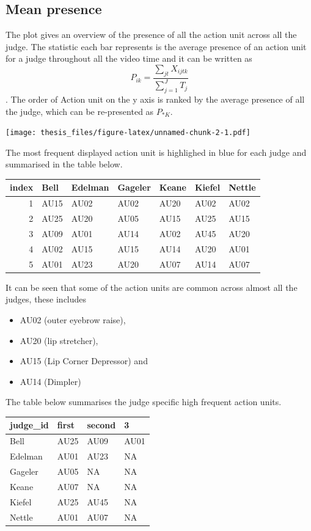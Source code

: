 \documentclass{monashthesis}
\begin{document}
\hypertarget{mean-presence}{%
\subsection{Mean presence}\label{mean-presence}}

The plot gives an overview of the presence of all the action unit across all the judge. The statistic each bar represents is the average presence of an action unit for a judge throughout all the video time and it can be written as \[P_{ik} = \frac{\sum_{jt}X_{ijtk}}{\sum_{j = 1}^JT_j}\]. The order of Action unit on the y axis is ranked by the average presence of all the judge, which can be re-presented as \(P_{* K}\).

\texttt{[image: thesis\_files/figure-latex/unnamed-chunk-2-1.pdf]}

The most frequent displayed action unit is highlighed in blue for each judge and summarised in the table below.

\begin{tabular}{r|l|l|l|l|l|l}
\hline
index & Bell & Edelman & Gageler & Keane & Kiefel & Nettle\\
\hline
1 & AU15 & AU02 & AU02 & AU20 & AU02 & AU02\\
\hline
2 & AU25 & AU20 & AU05 & AU15 & AU25 & AU15\\
\hline
3 & AU09 & AU01 & AU14 & AU02 & AU45 & AU20\\
\hline
4 & AU02 & AU15 & AU15 & AU14 & AU20 & AU01\\
\hline
5 & AU01 & AU23 & AU20 & AU07 & AU14 & AU07\\
\hline
\end{tabular}

It can be seen that some of the action units are common across almost all the judges, these includes

\begin{itemize}
\tightlist
\item
  AU02 (outer eyebrow raise),
\item
  AU20 (lip stretcher),
\item
  AU15 (Lip Corner Depressor) and
\item
  AU14 (Dimpler)
\end{itemize}

The table below summarises the judge specific high frequent action units.

\begin{tabular}{l|l|l|l}
\hline
judge\_id & first & second & 3\\
\hline
Bell & AU25 & AU09 & AU01\\
\hline
Edelman & AU01 & AU23 & NA\\
\hline
Gageler & AU05 & NA & NA\\
\hline
Keane & AU07 & NA & NA\\
\hline
Kiefel & AU25 & AU45 & NA\\
\hline
Nettle & AU01 & AU07 & NA\\
\hline
\end{tabular}
\end{document}
